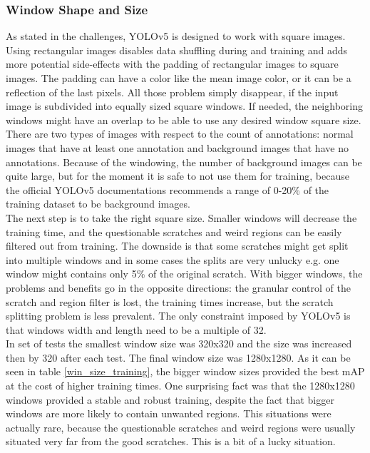 \subsubsection{Window Shape and Size}
As stated in the challenges, YOLOv5 is designed to work with square images. Using rectangular images disables data shuffling during and training and adds more potential side-effects with the padding of rectangular images to square images. The padding can have a color like the mean image color, or it can be a reflection of the last pixels. All those problem simply disappear, if the input image is subdivided into equally sized square windows. If needed, the neighboring windows might have an overlap to be able to use any desired window square size. \\
There are two types of images with respect to the count of annotations: normal images that have at least one annotation and background images that have no annotations. Because of the windowing, the number of background images can be quite large, but for the moment it is safe to not use them for training, because the official YOLOv5 documentations recommends a range of 0-20\% of the training dataset to be background images. \\
The next step is to take the right square size. Smaller windows will decrease the training time, and the questionable scratches and weird regions can be easily filtered out from training. The downside is that some scratches might get split into multiple windows and in some cases the splits are very unlucky e.g. one window might contains only 5\% of the original scratch. With bigger windows, the problems and benefits go in the opposite directions: the granular control of the scratch and region filter is lost, the training times increase, but the scratch splitting problem is less prevalent. The only constraint imposed by YOLOv5 is that windows width and length need to be a multiple of 32.\\
In set of tests the smallest window size was 320x320 and the size was increased then by 320 after each test. The final window size was 1280x1280. As it can be seen in table \ref{win_size_training}, the bigger window sizes provided the best mAP at the cost of higher training times. One surprising fact was that the 1280x1280 windows provided a stable and robust training, despite the fact that bigger windows are more likely to contain unwanted regions. This situations were actually rare, because the questionable scratches and weird regions were usually situated very far from the good scratches. This is a bit of a lucky situation. \\
